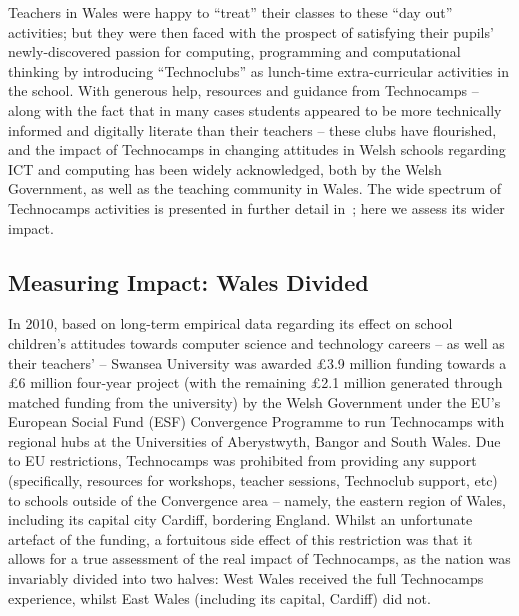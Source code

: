 \documentclass{llncs}
\begin{document}
Teachers in Wales were happy to ``treat'' their classes to these ``day
out'' activities; but they were then faced with the prospect of
satisfying their pupils' newly-discovered passion for computing,
programming and computational thinking by introducing ``Technoclubs''
as lunch-time extra-curricular activities in the school.  With
generous help, resources and guidance from Technocamps -- along with
the fact that in many cases students appeared to be more technically
informed and digitally literate than their teachers -- these clubs
have flourished, and the impact of Technocamps in changing attitudes
in Welsh schools regarding ICT and computing has been widely
acknowledged, both by the Welsh Government, as well as the teaching
community in Wales.  The wide spectrum of Technocamps activities is
presented in further detail in~\cite{crick+moller-wipsce2015}; here we
assess its wider impact.

\subsection{Measuring Impact: Wales Divided}\label{walesdivided}

In 2010, based on long-term empirical data regarding its effect on
school children's attitudes towards computer science and technology
careers -- as well as their teachers' -- Swansea University was
awarded \pounds 3.9 million funding towards a \pounds 6 million
four-year project (with the remaining \pounds 2.1 million generated
through matched funding from the university) by the Welsh Government
under the EU's European Social Fund (ESF) Convergence Programme to run
Technocamps with regional hubs at the Universities of Aberystwyth,
Bangor and South Wales.  Due to EU restrictions, Technocamps was
prohibited from providing any support (specifically, resources for
workshops, teacher sessions, Technoclub support, etc) to schools
outside of the Convergence area -- namely, the eastern region of
Wales, including its capital city Cardiff, bordering England.  Whilst
an unfortunate artefact of the funding, a fortuitous side effect of
this restriction was that it allows for a true assessment of the real
impact of Technocamps, as the nation was invariably divided into two
halves: West Wales received the full Technocamps experience, whilst
East Wales (including its capital, Cardiff) did not.

\end{document}
